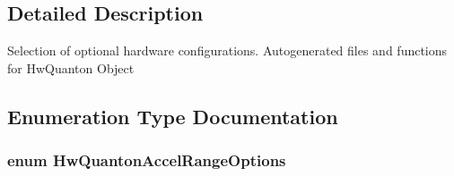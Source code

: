 \subsection{\-Detailed \-Description}
\-Selection of optional hardware configurations. \-Autogenerated files and functions for \-Hw\-Quanton \-Object 

\subsection{\-Enumeration \-Type \-Documentation}
\hypertarget{group___hw_quanton_gaf4114a991584fabf509a8bcfecfc8904}{
\subsubsection[{\-Hw\-Quanton\-Accel\-Range\-Options}]{\setlength{\rightskip}{0pt plus 5cm}enum {\bf \-Hw\-Quanton\-Accel\-Range\-Options}}}\label{group___hw_quanton_gaf4114a991584fabf509a8bcfecfc8904}

